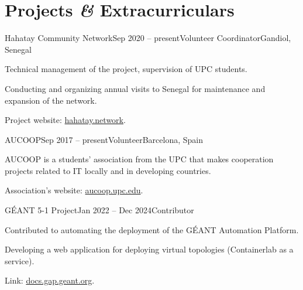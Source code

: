 \documentclass{resume}
\begin{document}

\section{Projects \textbf{\em\&} Extracurriculars}
\begin{content}

    \begin{position}{Hahatay Community Network}{Sep 2020 -- present}{Volunteer Coordinator}{}{Gandiol, Senegal} %
        \item Technical management of the project, supervision of UPC students.
        \item Conducting and organizing annual visits to Senegal for maintenance and expansion of the network.
        \item Project website: \href{https://hahatay.network}{hahatay.network}.
    \end{position}

    \begin{position}{AUCOOP}{Sep 2017 -- present}{Volunteer}{}{Barcelona, Spain} %
        \item AUCOOP is a students' association from the UPC that makes cooperation projects related to IT locally and in developing countries.
        \item Association's website: \href{https://aucoop.upc.edu}{aucoop.upc.edu}.
    \end{position}    

    \begin{position}{GÉANT 5-1 Project}{Jan 2022 -- Dec 2024}{Contributor}{}{} %
        \item Contributed to automating the deployment of the GÉANT Automation Platform.
        \item Developing a web application for deploying virtual topologies (Containerlab as a service).
        \item Link: \href{https://docs.gap.geant.org/}{docs.gap.geant.org}.
    \end{position}


\end{content}
\end{document}
